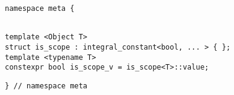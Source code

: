 
\begin{verbatim}
namespace meta {
\end{verbatim}
\begin{verbatim}

template <Object T>
struct is_scope : integral_constant<bool, ... > { };
template <typename T>
constexpr bool is_scope_v = is_scope<T>::value;

\end{verbatim}
\begin{verbatim}
} // namespace meta
\end{verbatim}

